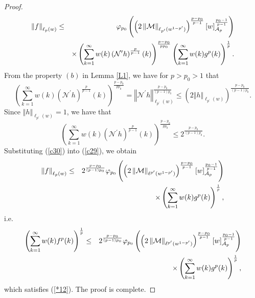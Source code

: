 \documentclass[a4paper]{amsart}
\theoremstyle{plain}
\numberwithin{equation}{section}
\begin{document}
\begin{proof}
\begin{eqnarray}
\left\Vert f\right\Vert _{\ell _{p}(w)} &\leq &\mathcal{\varphi }%
_{p_{0}}\left( \left( 2\left\Vert \mathcal{M}\right\Vert _{\ell _{p^{\prime
}}(w^{1-p^{\prime }})}\right) ^{\frac{p-p_{0}}{p-1}}\left[ w\right] _{%
\mathcal{A}_{p}}^{\frac{p_{0}-1}{p-1}}\right)  \notag \\
&&\times \left( \sum_{k=1}^{\infty }w(k)\left( \mathcal{N}^{\prime }h\right)
^{\frac{p}{p-1}}(k)\right) ^{\frac{p-p_{0}}{pp_{0}}}\left(
\sum_{k=1}^{\infty }w(k)g^{p}(k)\right) ^{\frac{1}{p}}.  \label{c29}
\end{eqnarray}%
From the property $(b)$ in Lemma \ref{L1}, we have for $p>p_{0}>1$ that 
\begin{equation*}
\left( \sum_{k=1}^{\infty }w(k)\left( \mathcal{N}^{\prime }h\right) ^{\frac{p%
}{p-1}}(k)\right) ^{\frac{p-p_{0}}{pp_{0}}}=\left\Vert \mathcal{N}^{\prime
}h\right\Vert _{\ell _{p^{\prime }}(w)}^{\frac{p-p_{0}}{\left( p-1\right)
p_{0}}}\leq \left( 2\left\Vert h\right\Vert _{\ell _{p^{\prime }}(w)}\right)
^{\frac{p-p_{0}}{\left( p-1\right) p_{0}}}.
\end{equation*}%
Since $\left\Vert h\right\Vert _{\ell _{p^{\prime }}(w)}=1$, we have that%
\begin{equation}
\left( \sum_{k=1}^{\infty }w(k)\left( \mathcal{N}^{\prime }h\right) ^{\frac{p%
}{p-1}}(k)\right) ^{\frac{p-p_{0}}{pp_{0}}}\leq 2^{\frac{p-p_{0}}{\left(
p-1\right) p_{0}}}.  \label{c30}
\end{equation}%
Substituting (\ref{c30}) into (\ref{c29}), we obtain%
\begin{eqnarray*}
\left\Vert f\right\Vert _{\ell _{p}(w)} &\leq &2^{\frac{p-p_{0}}{\left(
p-1\right) p_{0}}}\mathcal{\varphi }_{p_{0}}\left( \left( 2\left\Vert 
\mathcal{M}\right\Vert _{\ell ^{p^{\prime }}(w^{1-p^{\prime }})}\right) ^{%
\frac{p-p_{0}}{p-1}}\left[ w\right] _{\mathcal{A}_{p}}^{\frac{p_{0}-1}{p-1}%
}\right) \\
&&\times \left( \sum_{k=1}^{\infty }w(k)g^{p}(k)\right) ^{\frac{1}{p}},
\end{eqnarray*}%
i.e.%
\begin{eqnarray*}
\left( \sum_{k=1}^{\infty }w(k)f^{p}(k)\right) ^{\frac{1}{p}} &\leq &2^{%
\frac{p-p_{0}}{\left( p-1\right) p_{0}}}\mathcal{\varphi }_{p_{0}}\left(
\left( 2\left\Vert \mathcal{M}\right\Vert _{\ell ^{p^{\prime
}}(w^{1-p^{\prime }})}\right) ^{\frac{p-p_{0}}{p-1}}\left[ w\right] _{%
\mathcal{A}_{p}}^{\frac{p_{0}-1}{p-1}}\right) \\
&&\times \left( \sum_{k=1}^{\infty }w(k)g^{p}(k)\right) ^{\frac{1}{p}},
\end{eqnarray*}%
which satisfies (\ref{*12}). The proof is complete.
\end{proof}
\end{document}
